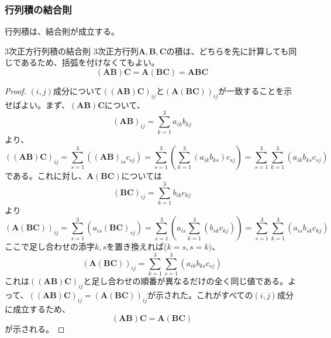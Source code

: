 \subsubsection{行列積の結合則}
行列積は、結合則が成立する。
\begin{theorem*}{3次正方行列積の結合則}
	3次正方行列\(\boldsymbol{A},\boldsymbol{B},\boldsymbol{C}\)の積は、どちらを先に計算しても同じであるため、括弧を付けなくてもよい。
	\begin{equation}
		(\boldsymbol{A}\boldsymbol{B})\boldsymbol{C}=\boldsymbol{A}(\boldsymbol{B}\boldsymbol{C})=\boldsymbol{A}\boldsymbol{B}\boldsymbol{C}
	\end{equation}
\end{theorem*}
\begin{proof}
	\((i,j)\)成分について\(((\boldsymbol{A}\boldsymbol{B})\boldsymbol{C})_{ij}\)と\((\boldsymbol{A}(\boldsymbol{B}\boldsymbol{C}))_{ij}\)が一致することを示せばよい。まず、\((\boldsymbol{A}\boldsymbol{B})\boldsymbol{C}\)について、
	\begin{equation}
		(\boldsymbol{A}\boldsymbol{B})_{ij}=\sum_{k=1}^{3} a_{ik}b_{kj}
	\end{equation}
	より、
	\begin{equation}
		((\boldsymbol{A}\boldsymbol{B})\boldsymbol{C})_{ij}
		=\sum_{s=1}^{3} \left((\boldsymbol{A}\boldsymbol{B})_{is}c_{sj}\right)
		=\sum_{s=1}^{3} \left(\sum_{k=1}^{3} \left(a_{ik}b_{ks} \right)c_{sj}\right)
		=\sum_{s=1}^{3} \sum_{k=1}^{3} \left(a_{ik}b_{ks}c_{sj}\right)
	\end{equation}
	である。これに対し、\(\boldsymbol{A}(\boldsymbol{B}\boldsymbol{C})\)については
	\begin{equation}
		(\boldsymbol{B}\boldsymbol{C})_{ij}=\sum_{k=1}^{3} b_{ik}c_{kj}
	\end{equation}
	より
	\begin{equation}
		(\boldsymbol{A}(\boldsymbol{B}\boldsymbol{C}))_{ij}
		=\sum_{s=1}^{3} \left(a_{is}(\boldsymbol{B}\boldsymbol{C})_{sj}\right)
		=\sum_{s=1}^{3} \left(a_{is}\sum_{k=1}^{3} \left(b_{sk}c_{kj}\right)\right)
		=\sum_{s=1}^{3} \sum_{k=1}^{3} \left(a_{is} b_{sk}c_{kj}\right)
	\end{equation}
	ここで足し合わせの添字\(k,s\)を置き換えれば(\(k=s,s=k)\)、
	\begin{equation}
		(\boldsymbol{A}(\boldsymbol{B}\boldsymbol{C}))_{ij}
		=\sum_{k=1}^{3} \sum_{s=1}^{3} \left(a_{ik} b_{ks}c_{sj}\right)
	\end{equation}
	これは\(((\boldsymbol{A}\boldsymbol{B})\boldsymbol{C})_{ij}\)と足し合わせの順番が異なるだけの全く同じ値である。よって、\(((\boldsymbol{A}\boldsymbol{B})\boldsymbol{C})_{ij}=(\boldsymbol{A}(\boldsymbol{B}\boldsymbol{C}))_{ij}\)が示された。これがすべての\((i,j)\)成分に成立するため、
	\begin{equation}
		(\boldsymbol{A}\boldsymbol{B})\boldsymbol{C}=\boldsymbol{A}(\boldsymbol{B}\boldsymbol{C})
	\end{equation}
	が示される。
\end{proof}
